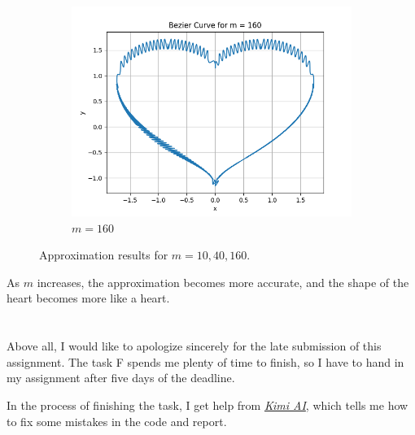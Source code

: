 \documentclass[a4paper]{article}
\begin{document}
\begin{figure}[htbp]
\begin{subfigure}[b]{0.32 \textwidth}
        \includegraphics[width=\textwidth]{../results/Task_F/Task_F_m_160.png}
        \caption{$m = 160$}
    \end{subfigure}
    \caption{Approximation results for $m = 10, 40, 160.$}
    \label{fig:F.results}
\end{figure}

As $m$ increases, the approximation becomes more accurate, and the shape of the heart becomes more like a heart.

\section*{}

Above all, I would like to apologize sincerely for the late submission of this assignment. 
The task F spends me plenty of time to finish, so I have to hand in my assignment after five days of the deadline.

In the process of finishing the task, I get help from \href{https://kimi.moonshot.cn}{\textit{Kimi AI}}, which tells me how to fix some mistakes in the code and report.
\end{document}
